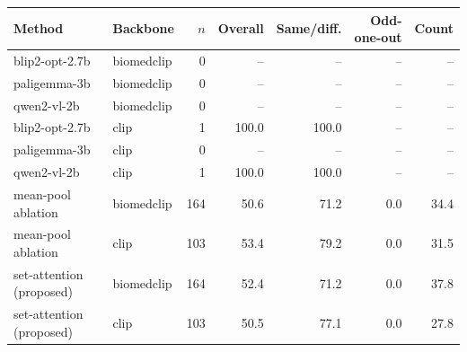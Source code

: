 \begin{tabular}{llrrrrr}
\toprule
Method & Backbone & $n$ & Overall & Same/diff. & Odd-one-out & Count \\
\midrule
blip2-opt-2.7b & biomedclip & 0 & -- & -- & -- & -- \\
paligemma-3b & biomedclip & 0 & -- & -- & -- & -- \\
qwen2-vl-2b & biomedclip & 0 & -- & -- & -- & -- \\
blip2-opt-2.7b & clip & 1 & 100.0 & 100.0 & -- & -- \\
paligemma-3b & clip & 0 & -- & -- & -- & -- \\
qwen2-vl-2b & clip & 1 & 100.0 & 100.0 & -- & -- \\
mean-pool ablation & biomedclip & 164 & 50.6 & 71.2 & 0.0 & 34.4 \\
mean-pool ablation & clip & 103 & 53.4 & 79.2 & 0.0 & 31.5 \\
set-attention (proposed) & biomedclip & 164 & 52.4 & 71.2 & 0.0 & 37.8 \\
set-attention (proposed) & clip & 103 & 50.5 & 77.1 & 0.0 & 27.8 \\
\bottomrule
\end{tabular}